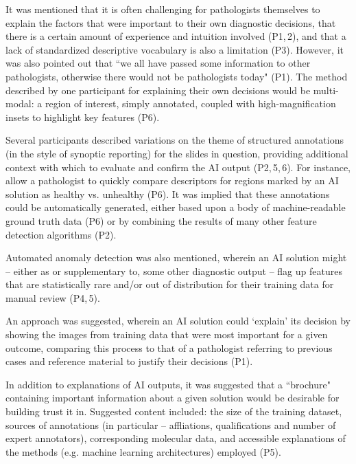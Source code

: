 \documentclass[final,5p,times,twocolumn,hyphens]{elsarticle}
\begin{document}
It was mentioned that it is often challenging for pathologists themselves to explain the factors that were important to their own diagnostic decisions, that there is a certain amount of experience and intuition involved (P1,\,2), and that a lack of standardized descriptive vocabulary is also a limitation (P3). However, it was also pointed out that ``we all have passed some information to other pathologists, otherwise there would not be pathologists today" (P1). The method described by one participant for explaining their own decisions would be multi-modal: a region of interest, simply annotated, coupled with high-magnification insets to highlight key features (P6).


Several participants described variations on the theme of structured annotations (in the style of synoptic reporting) for the slides in question, providing additional context with which to evaluate and confirm the AI output (P2,\,5,\,6). For instance, allow a pathologist to quickly compare descriptors for regions marked by an AI solution as healthy vs. unhealthy (P6). It was implied that these annotations could be automatically generated, either based upon a body of machine-readable ground truth data (P6) or by combining the results of many other feature detection algorithms (P2). 

Automated anomaly detection was also mentioned, wherein an AI solution might -- either as or supplementary to, some other diagnostic output -- flag up features that are statistically rare and/or out of distribution for their training data for manual review (P4,\,5).

An approach was suggested, wherein an AI solution could `explain' its decision by showing the images from training data that were most important for a given outcome, comparing this process to that of a pathologist referring to previous cases and reference material to justify their decisions (P1).

In addition to explanations of AI outputs, it was suggested that a ``brochure" containing important information about a given solution would be desirable for building trust it in. Suggested content included: the size of the training dataset, sources of annotations (in particular -- affliations, qualifications and number of expert annotators), corresponding molecular data, and accessible explanations of the methods (e.g. machine learning architectures) employed (P5). 
\end{document}

